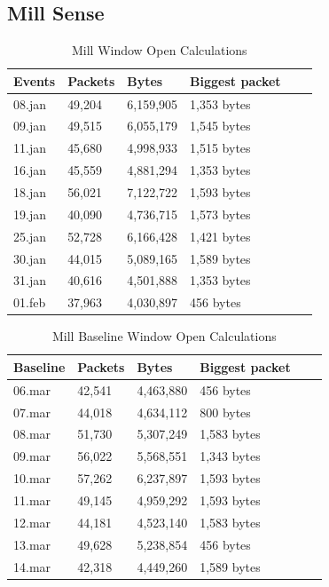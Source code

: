 \newpage
\subsection{Mill Sense}

\begin{table}[H]
    \centering
    \caption{Mill Window Open Calculations}
    \begin{tabular}{|l|l|l|l|l|l|}
    \hline
        \textbf{Events} & \textbf{Packets} & \textbf{Bytes} & \textbf{Biggest packet} \\ \hline
        08.jan & 49,204 & 6,159,905 & 1,353 bytes   \\ \hline
        09.jan & 49,515 & 6,055,179 & 1,545 bytes   \\ \hline
        11.jan & 45,680 & 4,998,933 & 1,515 bytes   \\ \hline
        16.jan & 45,559 & 4,881,294 & 1,353 bytes \\ \hline
        18.jan & 56,021 & 7,122,722 & 1,593 bytes   \\ \hline
        19.jan & 40,090 & 4,736,715 & 1,573 bytes \\ \hline
        25.jan & 52,728 & 6,166,428 & 1,421 bytes \\ \hline
        30.jan & 44,015 & 5,089,165 & 1,589 bytes  \\ \hline
        31.jan & 40,616 & 4,501,888 & 1,353 bytes \\ \hline
        01.feb & 37,963 & 4,030,897 & 456 bytes \\ \hline
    \end{tabular}
    \label{tab:MillWindowCalculations}
\end{table}

\begin{table}[H]
    \centering
    \caption{Mill Baseline Window Open Calculations}
    \begin{tabular}{|l|l|l|l|l|l|}
    \hline
        \textbf{Baseline} & \textbf{Packets} & \textbf{Bytes} & \textbf{Biggest packet} \\ \hline
        06.mar & 42,541 & 4,463,880 & 456 bytes \\ \hline
        07.mar & 44,018 & 4,634,112 & 800 bytes \\ \hline
        08.mar & 51,730 & 5,307,249 & 1,583 bytes \\ \hline
        09.mar & 56,022 & 5,568,551 & 1,343 bytes \\ \hline
        10.mar & 57,262 & 6,237,897 & 1,593 bytes \\ \hline
        11.mar & 49,145 & 4,959,292 & 1,593 bytes \\ \hline
        12.mar & 44,181 & 4,523,140 & 1,583 bytes \\ \hline
        13.mar & 49,628 & 5,238,854 & 456 bytes \\ \hline
        14.mar & 42,318 & 4,449,260 & 1,589 bytes \\ \hline
    \end{tabular}
    \label{tab:MillBaselineWindowCalculations}
\end{table}

